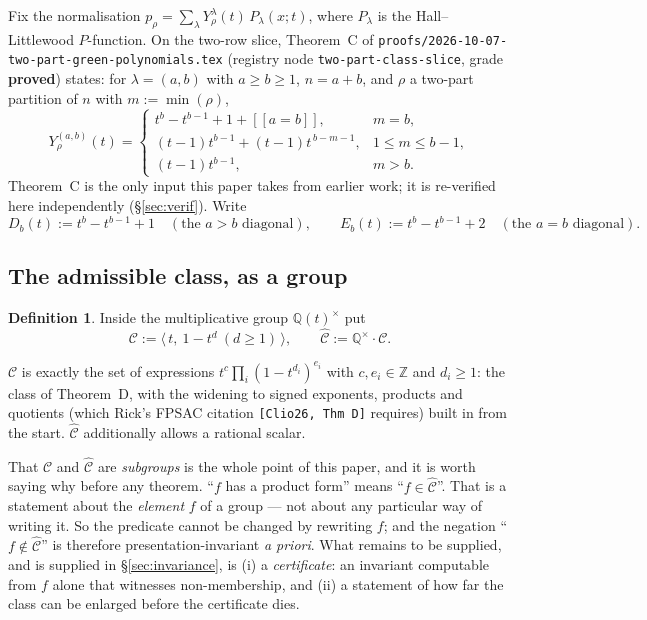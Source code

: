 \documentclass[11pt]{article}
\theoremstyle{definition}
\newtheorem{definition}[theorem]{Definition}
\newcommand{\ZZ}{\mathbb{Z}}
\newcommand{\QQ}{\mathbb{Q}}
\newcommand{\lam}{\lambda}
\newcommand{\Chat}{\widehat{\mathcal{C}}}
\newcommand{\lb}{[\![}
\newcommand{\rb}{]\!]}
\begin{document}
Fix the normalisation $p_\rho=\sum_\lam Y^{\lam}_\rho(t)\,P_\lam(x;t)$, where $P_\lam$ is the
Hall--Littlewood $P$-function. On the two-row slice, Theorem~C of
\texttt{proofs/2026-10-07-two-part-green-polynomials.tex} (registry node
\texttt{two-part-class-slice}, grade \textbf{proved}) states: for $\lam=(a,b)$ with $a\ge b\ge1$,
$n=a+b$, and $\rho$ a two-part partition of $n$ with $m:=\min(\rho)$,
\begin{equation}\label{eq:thmC}
  Y^{(a,b)}_{\rho}(t)=
  \begin{cases}
    t^{b}-t^{b-1}+1+\lb a=b\rb, & m=b,\\[2pt]
    (t-1)t^{b-1}+(t-1)t^{\,b-m-1}, & 1\le m\le b-1,\\[2pt]
    (t-1)t^{b-1}, & m>b.
  \end{cases}
\end{equation}
Theorem~C is the only input this paper takes from earlier work; it is re-verified here
independently (\S\ref{sec:verif}). Write
\[
  D_b(t):=t^b-t^{b-1}+1 \quad (\text{the } a>b \text{ diagonal}),\qquad
  E_b(t):=t^b-t^{b-1}+2 \quad (\text{the } a=b \text{ diagonal}).
\]

\subsection{The admissible class, as a group}

\begin{definition}\label{def:class}
Inside the multiplicative group $\QQ(t)^\times$ put
\[
  \mathcal{C}:=\bigl\langle\, t,\ 1-t^{d}\ (d\ge1)\,\bigr\rangle,
  \qquad
  \Chat:=\QQ^\times\cdot\mathcal{C}.
\]
\end{definition}

$\mathcal{C}$ is exactly the set of expressions $t^{c}\prod_{i}(1-t^{d_i})^{e_i}$ with
$c,e_i\in\ZZ$ and $d_i\ge1$: the class of Theorem~D, with the widening to signed exponents,
products and quotients (which Rick's FPSAC citation \texttt{[Clio26, Thm D]} requires) built in
from the start. $\Chat$ additionally allows a rational scalar.

That $\mathcal{C}$ and $\Chat$ are \emph{subgroups} is the whole point of this paper, and it is
worth saying why before any theorem. ``$f$ has a product form'' means ``$f\in\Chat$''. That is a
statement about the \emph{element} $f$ of a group --- not about any particular way of writing it.
So the predicate cannot be changed by rewriting $f$; and the negation ``$f\notin\Chat$'' is
therefore presentation-invariant \emph{a priori}. What remains to be supplied, and is supplied in
\S\ref{sec:invariance}, is (i) a \emph{certificate}: an invariant computable from $f$ alone that
witnesses non-membership, and (ii) a statement of how far the class can be enlarged before the
certificate dies.
\end{document}

